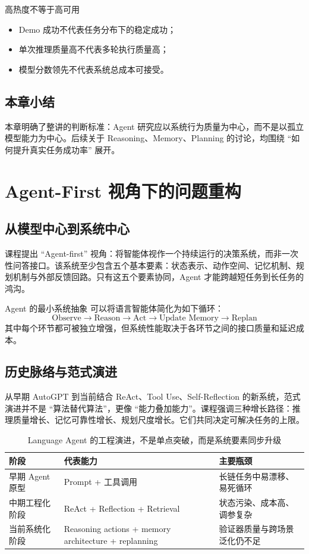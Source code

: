 \documentclass[a4paper]{article}
\begin{document}
\begin{warningbox}{高热度不等于高可用}
\begin{itemize}
    \item Demo 成功不代表任务分布下的稳定成功；
    \item 单次推理质量高不代表多轮执行质量高；
    \item 模型分数领先不代表系统总成本可接受。
\end{itemize}
\end{warningbox}

\subsection{本章小结}
本章明确了整讲的判断标准：Agent 研究应以系统行为质量为中心，而不是以孤立模型能力为中心。后续关于 Reasoning、Memory、Planning 的讨论，均围绕 ``如何提升真实任务成功率'' 展开。

\section{Agent-First 视角下的问题重构}

\subsection{从模型中心到系统中心}
课程提出 ``Agent-first'' 视角：将智能体视作一个持续运行的决策系统，而非一次性问答接口。该系统至少包含五个基本要素：状态表示、动作空间、记忆机制、规划机制与外部反馈回路。只有这五个要素协同，Agent 才能跨越短任务到长任务的鸿沟。

\begin{knowledgebox}{Agent 的最小系统抽象}
可以将语言智能体简化为如下循环：
\[
\text{Observe} \rightarrow \text{Reason} \rightarrow \text{Act} \rightarrow \text{Update Memory} \rightarrow \text{Replan}
\]
其中每个环节都可被独立增强，但系统性能取决于各环节之间的接口质量和延迟成本。
\end{knowledgebox}

\subsection{历史脉络与范式演进}
从早期 AutoGPT 到当前结合 ReAct、Tool Use、Self-Reflection 的新系统，范式演进并不是 ``算法替代算法''，更像 ``能力叠加能力''。课程强调三种增长路径：推理质量增长、记忆可靠性增长、规划尺度增长。它们共同决定可解决任务的上限。

\begin{table}[H]
\centering
\begin{tabular}{p{2.5cm}p{4.2cm}p{4.7cm}}
\toprule
\textbf{阶段} & \textbf{代表能力} & \textbf{主要瓶颈} \\
\midrule
早期 Agent 原型 & Prompt + 工具调用 & 长链任务中易漂移、易死循环 \\
中期工程化阶段 & ReAct + Reflection + Retrieval & 状态污染、成本高、调参复杂 \\
当前系统化阶段 & Reasoning actions + memory architecture + replanning & 验证器质量与跨场景泛化仍不足 \\
\bottomrule
\end{tabular}
\caption{Language Agent 的工程演进，不是单点突破，而是系统要素同步升级}
\end{table}
\end{document}
